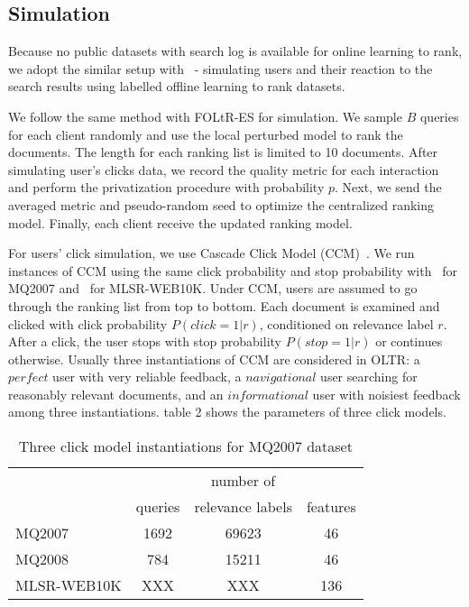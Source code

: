 \subsection{Simulation}

Because no public datasets with search log is available for online learning to rank, we adopt the similar setup with~\cite{DBLP:conf/wsdm/SchuthOWR16, DBLP:conf/wsdm/HofmannSWR13} - simulating users and their reaction to the search results using labelled offline learning to rank datasets.

We follow the same method with FOLtR-ES for simulation. We sample $B$ queries for each client randomly and use the local perturbed model to rank the documents. The length for each ranking list is limited to 10 documents. After simulating user's clicks data, we record the quality metric for each interaction and perform the privatization procedure with probability $p$. Next, we send the averaged metric and pseudo-random seed to optimize the centralized ranking model. Finally, each client receive the updated ranking model. 

For users' click simulation, we use Cascade Click Model (CCM)~\cite{DBLP:conf/wsdm/GuoLW09}. We run instances of CCM using the same click probability and stop probability with~\cite{kharitonov2019federated} for MQ2007 and~\cite{oosterhuis2016probabilistic} for MLSR-WEB10K. Under CCM, users are assumed to go through the ranking list from top to bottom. Each document is examined and clicked with click probability $P(click = 1 | r)$, conditioned on relevance label $r$. After a click, the user stops with stop probability $P(stop = 1 | r)$ or continues otherwise. Usually three instantiations of CCM are considered in OLTR: a $perfect$ user with very reliable feedback, a $navigational$ user searching for reasonably relevant documents, and an $informational$ user with noisiest feedback among three instantiations.  table 2 shows the parameters of three click models.

\begin{table}
	\caption{Three click model instantiations for MQ2007 dataset}
	\label{table:1:dataset}
	\centering
	\begin{tabular}{l c c c}
		\hline
		& & number of & \\
		& queries&  relevance labels  & features \\
		\midrule
		MQ2007  &   1692  &    69623  &    46    \\
		MQ2008  &  784  &   15211  &    46    \\
		MLSR-WEB10K  &   XXX &   XXX  &    136  \\
		\hline
	\end{tabular}
\end{table}


